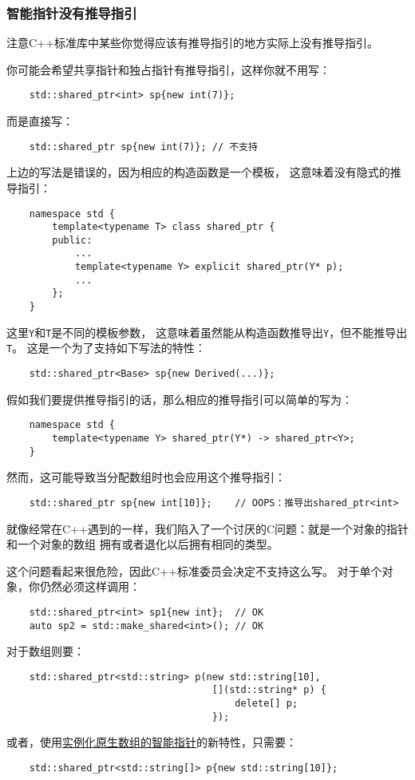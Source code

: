 \subsubsection{智能指针没有推导指引}
注意C++标准库中某些你觉得应该有推导指引的地方实际上没有推导指引。

你可能会希望共享指针和独占指针有推导指引，这样你就不用写：
\begin{lstlisting}
    std::shared_ptr<int> sp{new int(7)};
\end{lstlisting}
而是直接写：
\begin{lstlisting}
    std::shared_ptr sp{new int(7)}; // 不支持
\end{lstlisting}
上边的写法是错误的，因为相应的构造函数是一个模板，
这意味着没有隐式的推导指引：
\begin{lstlisting}
    namespace std {
        template<typename T> class shared_ptr {
        public:
            ...
            template<typename Y> explicit shared_ptr(Y* p);
            ...
        };
    }
\end{lstlisting}
这里\texttt{Y}和\texttt{T}是不同的模板参数，
这意味着虽然能从构造函数推导出\texttt{Y}，但不能推导出\texttt{T}。
这是一个为了支持如下写法的特性：
\begin{lstlisting}
    std::shared_ptr<Base> sp{new Derived(...)};
\end{lstlisting}
假如我们要提供推导指引的话，那么相应的推导指引可以简单的写为：
\begin{lstlisting}
    namespace std {
        template<typename Y> shared_ptr(Y*) -> shared_ptr<Y>;
    }
\end{lstlisting}
然而，这可能导致当分配数组时也会应用这个推导指引：
\begin{lstlisting}
    std::shared_ptr sp{new int[10]};    // OOPS：推导出shared_ptr<int>
\end{lstlisting}
就像经常在C++遇到的一样，我们陷入了一个讨厌的C问题：就是一个对象的指针和一个对象的数组
拥有或者退化以后拥有相同的类型。

这个问题看起来很危险，因此C++标准委员会决定不支持这么写。
对于单个对象，你仍然必须这样调用：
\begin{lstlisting}
    std::shared_ptr<int> sp1{new int};  // OK
    auto sp2 = std::make_shared<int>(); // OK
\end{lstlisting}
对于数组则要：
\begin{lstlisting}
    std::shared_ptr<std::string> p(new std::string[10],
                                    [](std::string* p) {
                                        delete[] p;
                                    });
\end{lstlisting}
或者，使用\hyperref[ch28.2.1]{实例化原生数组的智能指针}的新特性，只需要：
\begin{lstlisting}
    std::shared_ptr<std::string[]> p{new std::string[10]};
\end{lstlisting}

